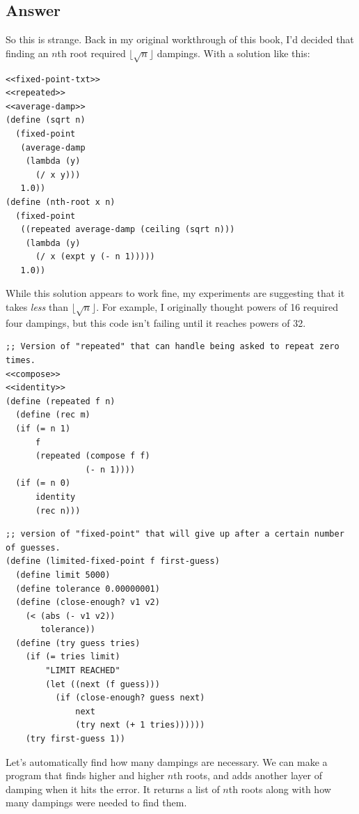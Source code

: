 \documentclass[final,fleqn,titlepage]{article}
\begin{document}
\subsection{Answer}
\label{sec:org28fcef5}
So this is strange. Back in my original workthrough of this book, I'd decided
that finding an \(n\)th root required \(\lfloor\sqrt{n}\rfloor\) dampings. With a solution like this:
\begin{verbatim}
<<fixed-point-txt>>
<<repeated>>
<<average-damp>>
(define (sqrt n)
  (fixed-point
   (average-damp
    (lambda (y)
      (/ x y)))
   1.0))
(define (nth-root x n)
  (fixed-point
   ((repeated average-damp (ceiling (sqrt n)))
    (lambda (y)
      (/ x (expt y (- n 1)))))
   1.0))
\end{verbatim}
While this solution appears to work fine, my experiments are suggesting that it
takes \emph{less} than \(\lfloor\sqrt{n}\rfloor\). For example, I originally thought
powers of 16 required four dampings, but this code isn't failing until it
reaches powers of 32.
\begin{verbatim}
;; Version of "repeated" that can handle being asked to repeat zero times.
<<compose>>
<<identity>>
(define (repeated f n)
  (define (rec m)
  (if (= n 1)
      f
      (repeated (compose f f)
                (- n 1))))
  (if (= n 0)
      identity
      (rec n)))
\end{verbatim}
\begin{verbatim}
;; version of "fixed-point" that will give up after a certain number of guesses.
(define (limited-fixed-point f first-guess)
  (define limit 5000)
  (define tolerance 0.00000001)
  (define (close-enough? v1 v2)
    (< (abs (- v1 v2)) 
       tolerance))
  (define (try guess tries)
    (if (= tries limit)
        "LIMIT REACHED"
        (let ((next (f guess)))
          (if (close-enough? guess next)
              next
              (try next (+ 1 tries))))))
    (try first-guess 1))
\end{verbatim}
Let's automatically find how many dampings are necessary. We can make a program that finds higher and higher \(n\)th roots, and adds another layer of damping when it hits the error. It returns a list of \(n\)th roots along with how many dampings were needed to find them.
\end{document}
